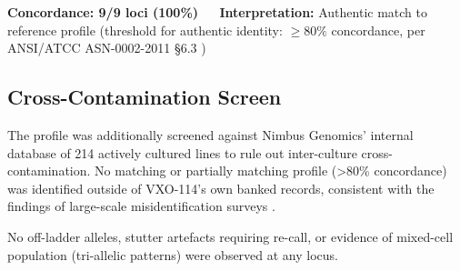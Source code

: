 \begin{center}
\begin{minipage}{0.85\textwidth}
  \begin{tcolorbox}[colback=labgreen!10, colframe=labgreen, arc=2pt, boxrule=0.8pt]
    \centering
    \textbf{Concordance: 9/9 loci (100\%)} $\quad$ \textbf{Interpretation:} Authentic match
    to reference profile (threshold for authentic identity: $\geq 80\%$ concordance, per
    ANSI/ATCC ASN-0002-2011 \S 6.3 \cite{ansi_atcc_asn0002,capes_davis_2013})
  \end{tcolorbox}
\end{minipage}
\end{center}

\subsection{Cross-Contamination Screen}

The profile was additionally screened against Nimbus Genomics' internal database of 214
actively cultured lines to rule out inter-culture cross-contamination. No matching or
partially matching profile (\textgreater 80\% concordance) was identified outside of
VXO-114's own banked records, consistent with the findings of large-scale misidentification
surveys \cite{yu_2015_str}.

No off-ladder alleles, stutter artefacts requiring re-call, or evidence of mixed-cell
population (tri-allelic patterns) were observed at any locus.
